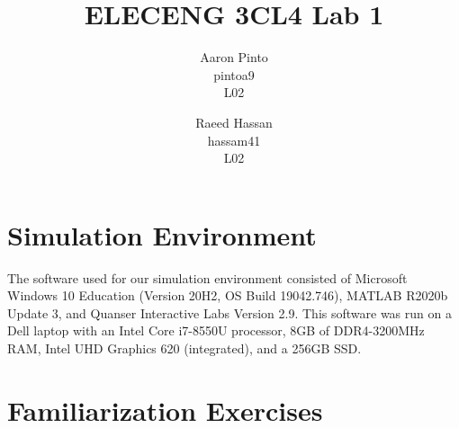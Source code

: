 \documentclass[12pt]{article}
\title{ELECENG 3CL4 Lab 1}
\author{
    Aaron Pinto \\
    pintoa9 \\
    L02
    \and
    Raeed Hassan \\
    hassam41 \\
    L02
}
\begin{document}
\maketitle
\clearpage

\section*{Simulation Environment}
The software used for our simulation environment consisted of Microsoft Windows 10 Education (Version 20H2, OS Build 19042.746), MATLAB R2020b Update 3, and Quanser Interactive Labs Version 2.9. This software was run on a Dell laptop with an Intel Core i7-8550U processor, 8GB of DDR4-3200MHz RAM, Intel UHD Graphics 620 (integrated), and a 256GB SSD.

\section*{Familiarization Exercises} %
\end{document}

